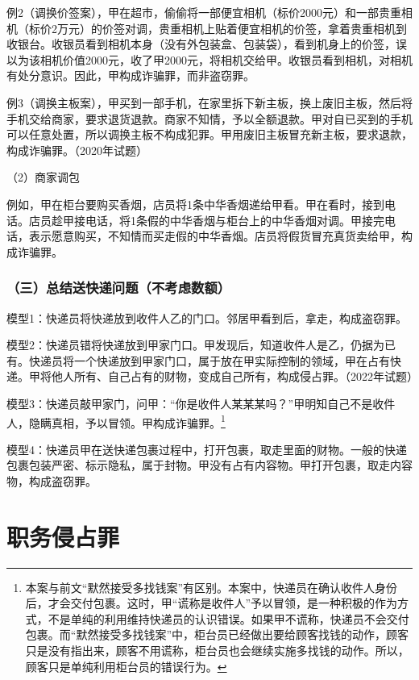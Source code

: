例2（调换价签案），甲在超市，偷偷将一部便宜相机（标价2000元）和一部贵重相机（标价2万元）的价签对调，贵重相机上贴着便宜相机的价签，拿着贵重相机到收银台。收银员看到相机本身（没有外包装盒、包装袋），看到机身上的价签，误以为该相机价值2000元，收了甲2000元，将相机交给甲。收银员看到相机，对相机有处分意识。因此，甲构成诈骗罪，而非盗窃罪。

例3（调换主板案），甲买到一部手机，在家里拆下新主板，换上废旧主板，然后将手机交给商家，要求退货退款。商家不知情，予以全额退款。甲对自已买到的手机可以任意处置，所以调换主板不构成犯罪。甲用废旧主板冒充新主板，要求退款，构成诈骗罪。（2020年试题）

（2）商家调包

例如，甲在柜台要购买香烟，店员将1条中华香烟递给甲看。甲在看时，接到电话。店员趁甲接电话，将1条假的中华香烟与柜台上的中华香烟对调。甲接完电话，表示愿意购买，不知情而买走假的中华香烟。店员将假货冒充真货卖给甲，构成诈骗罪。

\subsubsection*{（三）总结送快递问题（不考虑数额）}

模型1：快递员将快递放到收件人乙的门口。邻居甲看到后，拿走，构成盗窃罪。

模型2：快递员错将快递放到甲家门口。甲发现后，知道收件人是乙，仍据为已有。快递员将一个快递放到甲家门口，属于放在甲实际控制的领域，甲在占有快递。甲将他人所有、自己占有的财物，变成自己所有，构成侵占罪。（2022年试题）

模型3：快递员敲甲家门，问甲：“你是收件人某某某吗？”甲明知自己不是收件人，隐瞒真相，予以冒领。甲构成诈骗罪。\footnote{本案与前文“默然接受多找钱案”有区别。本案中，快递员在确认收件人身份后，才会交付包裹。这时，甲“谎称是收件人”予以冒领，是一种积极的作为方式，不是单纯的利用维持快递员的认识错误。如果甲不谎称，快递员不会交付包裹。而“默然接受多找钱案”中，柜台员已经做出要给顾客找钱的动作，顾客只是没有指出来，顾客不用谎称，柜台员也会继续实施多找钱的动作。所以，顾客只是单纯利用柜台员的错误行为。}

模型4：快递员甲在送快递包裹过程中，打开包裹，取走里面的财物。一般的快递包裹包装严密、标示隐私，属于封物。甲没有占有内容物。甲打开包裹，取走内容物，构成盗窃罪。

\section{职务侵占罪}

